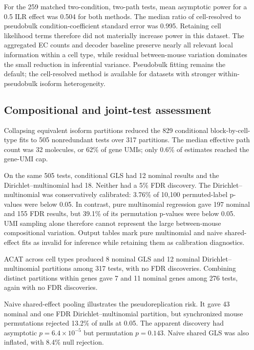 \documentclass[11pt]{article}
\begin{document}
For the 259 matched two-condition, two-path tests, mean asymptotic power for a 0.5 ILR effect was 0.504 for both methods. The median ratio of cell-resolved to pseudobulk condition-coefficient standard error was 0.995. Retaining cell likelihood terms therefore did not materially increase power in this dataset. The aggregated EC counts and decoder baseline preserve nearly all relevant local information within a cell type, while residual between-mouse variation dominates the small reduction in inferential variance. Pseudobulk fitting remains the default; the cell-resolved method is available for datasets with stronger within-pseudobulk isoform heterogeneity.

\subsection*{Compositional and joint-test assessment}

Collapsing equivalent isoform partitions reduced the 829 conditional block-by-cell-type fits to 505 nonredundant tests over 317 partitions. The median effective path count was 32 molecules, or 62\% of gene UMIs; only 0.6\% of estimates reached the gene-UMI cap.

On the same 505 tests, conditional GLS had 12 nominal results and the Dirichlet--multinomial had 18. Neither had a 5\% FDR discovery. The Dirichlet--multinomial was conservatively calibrated: 3.76\% of 10,100 permuted-label p-values were below 0.05. In contrast, pure multinomial regression gave 197 nominal and 155 FDR results, but 39.1\% of its permutation p-values were below 0.05. UMI sampling alone therefore cannot represent the large between-mouse compositional variation. Output tables mark pure multinomial and naive shared-effect fits as invalid for inference while retaining them as calibration diagnostics.

ACAT across cell types produced 8 nominal GLS and 12 nominal Dirichlet--multinomial partitions among 317 tests, with no FDR discoveries. Combining distinct partitions within genes gave 7 and 11 nominal genes among 276 tests, again with no FDR discoveries.

Naive shared-effect pooling illustrates the pseudoreplication risk. It gave 43 nominal and one FDR Dirichlet--multinomial partition, but synchronized mouse permutations rejected 13.2\% of nulls at 0.05. The apparent discovery had asymptotic \(p=6.4\times10^{-5}\) but permutation \(p=0.143\). Naive shared GLS was also inflated, with 8.4\% null rejection.
\end{document}
